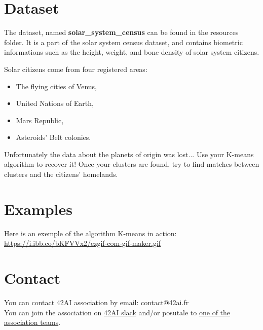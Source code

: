 \documentclass{42-en}
\begin{document}
\section*{Dataset}
The dataset, named \textbf{solar\_system\_census} can be found in
the resources folder.  
It is a part of the solar system census dataset, and contains biometric
informations such as the height, weight, and bone density of solar
system citizens.  

Solar citizens come from four registered areas:
\begin{itemize}
  \item The flying cities of Venus,
  \item United Nations of Earth,
  \item Mars Republic,
  \item Asteroids' Belt colonies.  
\end{itemize}

Unfortunately the data about the planets of origin was lost...  
Use your K-means algorithm to recover it!  
Once your clusters are found, try to find matches between clusters and the citizens' homelands.


\section*{Examples}
Here is an exemple of the algorithm K-means in action:\\
\url{https://i.ibb.co/bKFVVx2/ezgif-com-gif-maker.gif}



\newpage

\section*{Contact}
You can contact 42AI association by email: contact@42ai.fr\\
You can join the association on \href{https://join.slack.com/t/42-ai/shared_invite/zt-ebccw5r7-YPkDM6xOiYRPjqJXkrKgcA}{42AI slack}
and/or posutale to \href{https://forms.gle/VAFuREWaLmaqZw2D8}{one of the association teams}.
\end{document}
